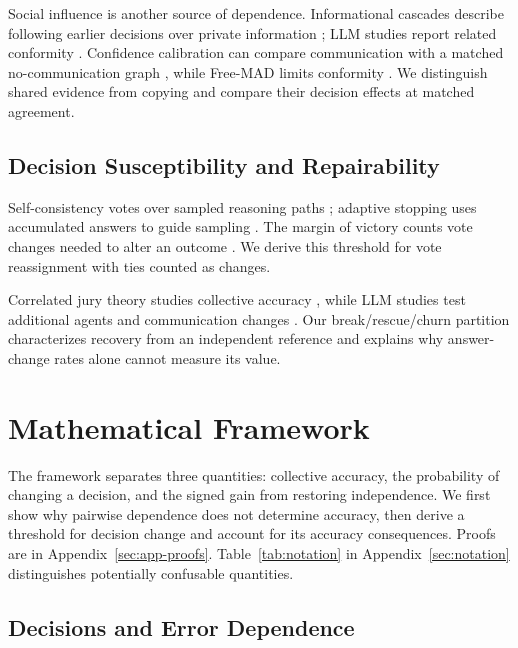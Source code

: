 \documentclass[11pt,a4paper]{article}
\theoremstyle{definition}
\begin{document}
Social influence is another source of dependence. Informational cascades describe following earlier decisions over private information \citep{bikhchandani-etal-1992-theory,banerjee-1992-simple}; LLM studies report related conformity \citep{weng-etal-2025-conformity,zhu-etal-2025-conformity,chuang-etal-2024-simulating}. Confidence calibration can compare communication with a matched no-communication graph \citep{huang-etal-2026-counterfactual}, while Free-MAD limits conformity \citep{cui-etal-2026-free}. We distinguish shared evidence from copying and compare their decision effects at matched agreement.

\subsection{Decision Susceptibility and Repairability}
\label{sec:rw-susceptibility}

Self-consistency votes over sampled reasoning paths \citep{wang-etal-2023-selfconsistency}; adaptive stopping uses accumulated answers to guide sampling \citep{aggarwal-etal-2023-lets}. The margin of victory counts vote changes needed to alter an outcome \citep{xia-2012-margin}. We derive this threshold for vote reassignment with ties counted as changes.

Correlated jury theory studies collective accuracy \citep{ladha-1992-condorcet}, while LLM studies test additional agents and communication changes \citep{li-etal-2024-more,huang-etal-2026-counterfactual,cui-etal-2026-free}. Our break/rescue/churn partition characterizes recovery from an independent reference and explains why answer-change rates alone cannot measure its value.

\section{Mathematical Framework}
\label{sec:main-theory}

The framework separates three quantities: collective accuracy, the probability
of changing a decision, and the signed gain from restoring independence.
We first show why pairwise dependence does not determine accuracy, then derive
a threshold for decision change and account for its accuracy consequences. Proofs are in Appendix~\ref{sec:app-proofs}.
Table~\ref{tab:notation} in Appendix~\ref{sec:notation} distinguishes
potentially confusable quantities.

\subsection{Decisions and Error Dependence}
\label{sec:main-quantities}
\end{document}
